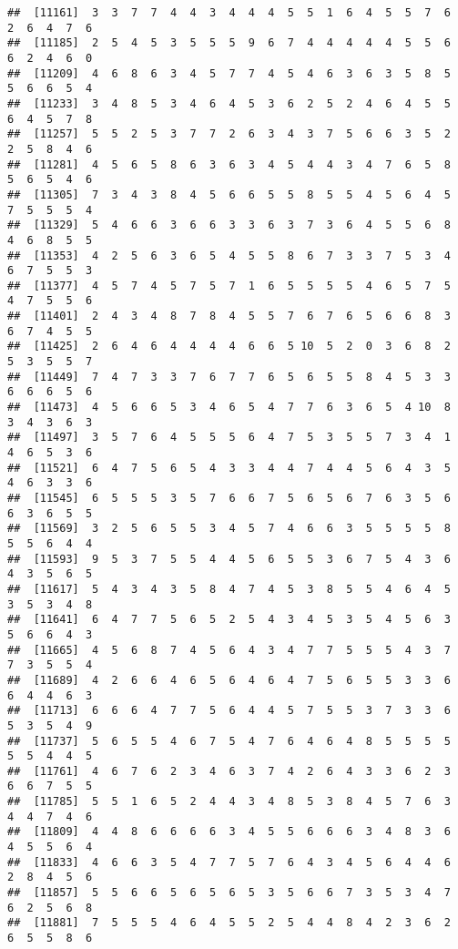 \documentclass[
]{book}
\begin{document}
\begin{verbatim}
##  [11161]  3  3  7  7  4  4  3  4  4  4  5  5  1  6  4  5  5  7  6  2  6  4  7  6
##  [11185]  2  5  4  5  3  5  5  5  9  6  7  4  4  4  4  4  5  5  6  6  2  4  6  0
##  [11209]  4  6  8  6  3  4  5  7  7  4  5  4  6  3  6  3  5  8  5  5  6  6  5  4
##  [11233]  3  4  8  5  3  4  6  4  5  3  6  2  5  2  4  6  4  5  5  6  4  5  7  8
##  [11257]  5  5  2  5  3  7  7  2  6  3  4  3  7  5  6  6  3  5  2  2  5  8  4  6
##  [11281]  4  5  6  5  8  6  3  6  3  4  5  4  4  3  4  7  6  5  8  5  6  5  4  6
##  [11305]  7  3  4  3  8  4  5  6  6  5  5  8  5  5  4  5  6  4  5  7  5  5  5  4
##  [11329]  5  4  6  6  3  6  6  3  3  6  3  7  3  6  4  5  5  6  8  4  6  8  5  5
##  [11353]  4  2  5  6  3  6  5  4  5  5  8  6  7  3  3  7  5  3  4  6  7  5  5  3
##  [11377]  4  5  7  4  5  7  5  7  1  6  5  5  5  5  4  6  5  7  5  4  7  5  5  6
##  [11401]  2  4  3  4  8  7  8  4  5  5  7  6  7  6  5  6  6  8  3  6  7  4  5  5
##  [11425]  2  6  4  6  4  4  4  4  6  6  5 10  5  2  0  3  6  8  2  5  3  5  5  7
##  [11449]  7  4  7  3  3  7  6  7  7  6  5  6  5  5  8  4  5  3  3  6  6  6  5  6
##  [11473]  4  5  6  6  5  3  4  6  5  4  7  7  6  3  6  5  4 10  8  3  4  3  6  3
##  [11497]  3  5  7  6  4  5  5  5  6  4  7  5  3  5  5  7  3  4  1  4  6  5  3  6
##  [11521]  6  4  7  5  6  5  4  3  3  4  4  7  4  4  5  6  4  3  5  4  6  3  3  6
##  [11545]  6  5  5  5  3  5  7  6  6  7  5  6  5  6  7  6  3  5  6  6  3  6  5  5
##  [11569]  3  2  5  6  5  5  3  4  5  7  4  6  6  3  5  5  5  5  8  5  5  6  4  4
##  [11593]  9  5  3  7  5  5  4  4  5  6  5  5  3  6  7  5  4  3  6  4  3  5  6  5
##  [11617]  5  4  3  4  3  5  8  4  7  4  5  3  8  5  5  4  6  4  5  3  5  3  4  8
##  [11641]  6  4  7  7  5  6  5  2  5  4  3  4  5  3  5  4  5  6  3  5  6  6  4  3
##  [11665]  4  5  6  8  7  4  5  6  4  3  4  7  7  5  5  5  4  3  7  7  3  5  5  4
##  [11689]  4  2  6  6  4  6  5  6  4  6  4  7  5  6  5  5  3  3  6  6  4  4  6  3
##  [11713]  6  6  6  4  7  7  5  6  4  4  5  7  5  5  3  7  3  3  6  5  3  5  4  9
##  [11737]  5  6  5  5  4  6  7  5  4  7  6  4  6  4  8  5  5  5  5  5  5  4  4  5
##  [11761]  4  6  7  6  2  3  4  6  3  7  4  2  6  4  3  3  6  2  3  6  6  7  5  5
##  [11785]  5  5  1  6  5  2  4  4  3  4  8  5  3  8  4  5  7  6  3  4  4  7  4  6
##  [11809]  4  4  8  6  6  6  6  3  4  5  5  6  6  6  3  4  8  3  6  4  5  5  6  4
##  [11833]  4  6  6  3  5  4  7  7  5  7  6  4  3  4  5  6  4  4  6  2  8  4  5  6
##  [11857]  5  5  6  6  5  6  5  6  5  3  5  6  6  7  3  5  3  4  7  6  2  5  6  8
##  [11881]  7  5  5  5  4  6  4  5  5  2  5  4  4  8  4  2  3  6  2  6  5  5  8  6

\end{verbatim}
\end{document}
